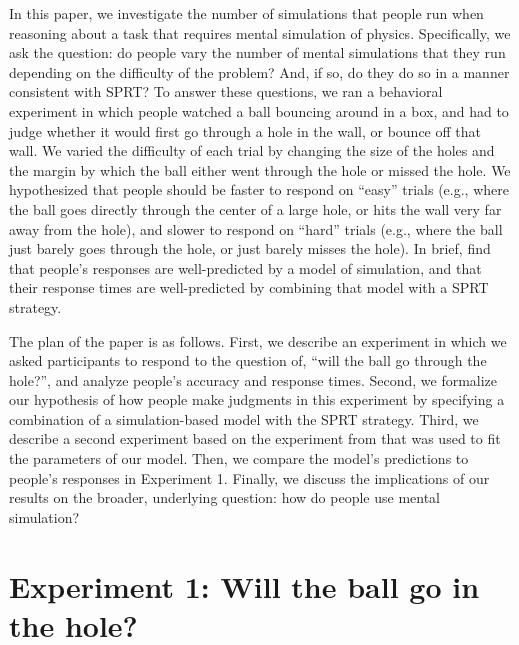 \documentclass[10pt,letterpaper]{article}
\begin{document}
In this paper, we investigate the number of simulations that people run when reasoning about a task that requires mental simulation of physics. Specifically, we ask the question: do people vary the number of mental simulations that they run depending on the difficulty of the problem? And, if so, do they do so in a manner consistent with SPRT? To answer these questions, we ran a behavioral experiment in which people watched a ball bouncing around in a box, and had to judge whether it would first go through a hole in the wall, or bounce off that wall. We varied the difficulty of each trial by changing the size of the holes and the margin by which the ball either went through the hole or missed the hole. We hypothesized that people should be faster to respond on ``easy'' trials (e.g., where the ball goes directly through the center of a large hole, or hits the wall very far away from the hole), and slower to respond on ``hard'' trials (e.g., where the ball just barely goes through the hole, or just barely misses the hole). In brief, find that people's responses are well-predicted by a model of simulation, and that their response times are well-predicted by combining that model with a SPRT strategy.

The plan of the paper is as follows. First, we describe an experiment in which we asked participants to respond to the question of, ``will the ball go through the hole?'', and analyze people's accuracy and response times. Second, we formalize our hypothesis of how people make judgments in this experiment by specifying a combination of a simulation-based model with the SPRT strategy. Third, we describe a second experiment based on the experiment from  that was used to fit the parameters of our model. Then, we compare the model's predictions to people's responses in Experiment 1. Finally, we discuss the implications of our results on the broader, underlying question: how do people use mental simulation?

\section{Experiment 1: Will the ball go in the hole?}
\end{document}
